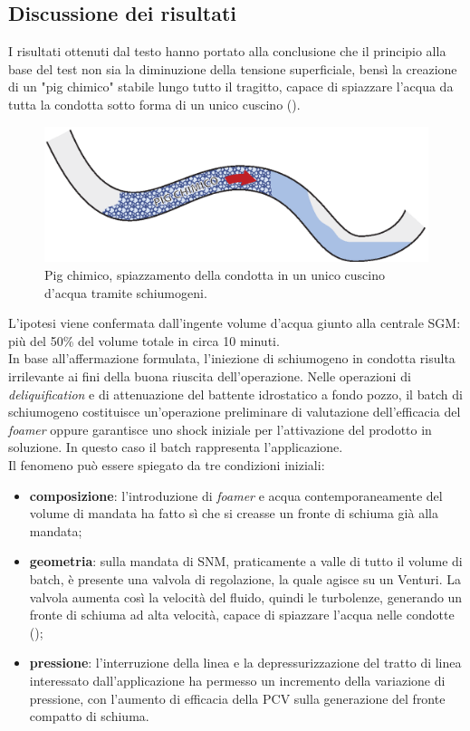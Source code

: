 \subsection{Discussione dei risultati}
I risultati ottenuti dal testo hanno portato alla conclusione che il principio alla base del test non sia la diminuzione della tensione superficiale, bensì la creazione di un "pig chimico" stabile lungo tutto il tragitto, capace di spiazzare l'acqua da tutta la condotta sotto forma di un unico cuscino ().\\
\begin{figure}[htbp]
    \centering
    \includegraphics[width=\textwidth]{fig/test/pig-chimico.eps}
    \caption{Pig chimico, spiazzamento della condotta in un unico cuscino d'acqua tramite schiumogeni.} 
    \label{fig:pig-chimico}
\end{figure}
L'ipotesi viene confermata dall'ingente volume d'acqua giunto alla centrale SGM: più del 50\% del volume totale in circa 10 minuti.\\
In base all'affermazione formulata, l'iniezione di schiumogeno in condotta risulta irrilevante ai fini della buona riuscita dell'operazione. Nelle operazioni di \textit{deliquification} e di attenuazione del battente idrostatico a fondo pozzo, il batch di schiumogeno costituisce un'operazione preliminare di valutazione dell'efficacia del \textit{foamer} oppure garantisce uno shock iniziale per l'attivazione del prodotto in soluzione. In questo caso il batch rappresenta l'applicazione.\\
Il fenomeno può essere spiegato da tre condizioni iniziali:
\begin{itemize}
    \item \textbf{composizione}: l'introduzione di \textit{foamer} e acqua contemporaneamente del volume di mandata ha fatto sì che si creasse un fronte di schiuma già alla mandata;
    \item \textbf{geometria}: sulla mandata di SNM, praticamente a valle di tutto il volume di batch, è presente una valvola di regolazione, la quale agisce su un Venturi. La valvola aumenta così la velocità del fluido, quindi le turbolenze, generando un fronte di schiuma ad alta velocità, capace di spiazzare l'acqua nelle condotte ();
    \item \textbf{pressione}: l'interruzione della linea e la depressurizzazione del tratto di linea interessato dall'applicazione ha permesso un incremento della variazione di pressione, con l'aumento di efficacia della PCV sulla generazione del fronte compatto di schiuma.
\end{itemize}
